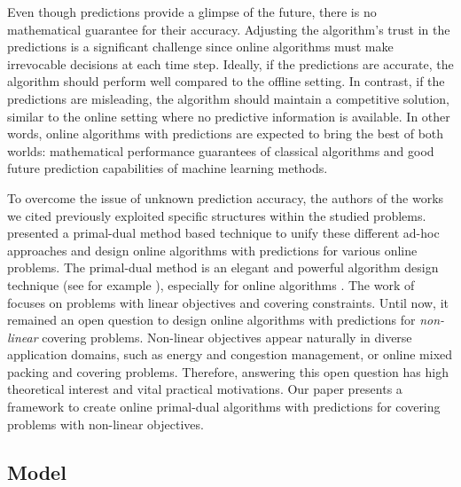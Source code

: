 Even though predictions provide a glimpse of the future, there is no mathematical guarantee for their accuracy. Adjusting the algorithm's trust in the predictions is a significant challenge since online algorithms must make irrevocable decisions at each time step. Ideally, if the predictions are accurate, the algorithm should perform well compared to the offline setting. In contrast, if the predictions are misleading, the algorithm should maintain a competitive solution, similar to the online setting where no predictive information is available. In other words, online algorithms with predictions are expected to bring the best of both worlds: mathematical performance guarantees of classical algorithms and good future prediction capabilities of machine learning methods.

To overcome the issue of unknown prediction accuracy, the authors of the works we cited previously exploited specific structures within the studied problems. \cite{BamasMaggiori20:The-Primal-Dual-method} presented a primal-dual method based technique to unify these different ad-hoc approaches and design online algorithms with predictions for various online problems. The primal-dual method is an elegant and powerful algorithm design technique (see for example \cite{WilliamsonShmoys11:The-design-of-approximation}), especially for online algorithms \cite{BuchbinderNaor09:Online-primal-dual, BuchbinderNaor09:The-Design-of-Competitive}. The work of \cite{BamasMaggiori20:The-Primal-Dual-method} focuses on problems with linear objectives and covering constraints. Until now, it remained an open question to design online algorithms with predictions for \emph{non-linear} covering problems. Non-linear objectives appear naturally in diverse application domains, such as energy and congestion management, or online mixed packing and covering problems. Therefore, answering this open question has high theoretical interest and vital practical motivations. Our paper presents a framework to create online primal-dual algorithms with predictions for covering problems with non-linear objectives.


\subsection{Model}  	\label{sec:model}

